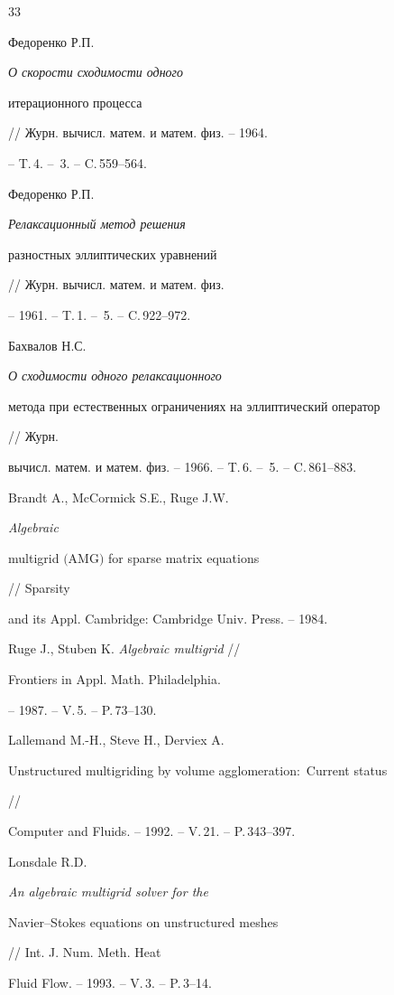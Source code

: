 \begin{thebibliography}{33}





\bibitem{[11]} %


Федоренко Р.П. {\em О скорости сходимости одного


итерационного процесса} // Журн. вычисл. матем. и матем. физ. -- 1964.


-- T.\,4. -- \No\,3. -- C.\,559--564.


\bibitem{[12]} %


Федоренко Р.П. {\em Релаксационный метод решения


разностных эллиптических уравнений} // Журн. вычисл. матем. и матем. физ.


-- 1961. -- T.\,1. -- \No\,5. -- C.\,922--972.




Бахвалов Н.С. {\em О сходимости одного релаксационного


метода при естественных ограничениях на эллиптический оператор} // Журн.


вычисл. матем. и матем. физ. -- 1966. -- T.\,6. -- \No\,5. -- C.\,861--883.


\bibitem{[6]} %


Brandt A., McCormick S.E., Ruge J.W. {\it Algebraic


multigrid $($AMG$)$ for sparse matrix equations} // Sparsity


and its Appl. Cambridge: Cambridge Univ. Press. -- 1984.


\bibitem{[26]} %


Ruge J., Stuben K. {\it Algebraic multigrid} //


Frontiers in Appl. Math. Philadelphia.


-- 1987. -- V.\,5. -- P.\,73--130.


\bibitem{[23]} %


Lallemand M.-H., Steve H., Derviex A. {\it


Unstructured multigriding by volume agglomeration$:$ Current status} //


Computer and Fluids. -- 1992. -- V.\,21. -- P.\,343--397.


\bibitem{[24]} %


Lonsdale R.D. {\it An algebraic multigrid solver for the


Navier--Stokes equations on unstructured meshes} // Int. J. Num. Meth. Heat


Fluid Flow. -- 1993. -- V.\,3. -- P.\,3--14.



\end{thebibliography}
